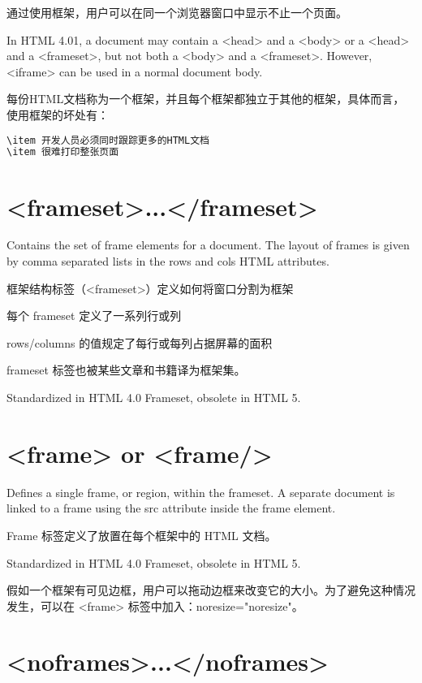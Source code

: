 通过使用框架，用户可以在同一个浏览器窗口中显示不止一个页面。

In HTML 4.01, a document may contain a <head> and a <body> or a <head> and a <frameset>, but not both a <body> and a <frameset>. However, <iframe> can be used in a normal document body.

每份HTML文档称为一个框架，并且每个框架都独立于其他的框架，具体而言，使用框架的坏处有：

\begin{lstlisting}[language=HTML]
\item 开发人员必须同时跟踪更多的HTML文档
\item 很难打印整张页面
\end{lstlisting}


\section{<frameset>...</frameset>}


Contains the set of frame elements for a document. The layout of frames is given by comma separated lists in the rows and cols HTML attributes.

\begin{compactitem}
\item 框架结构标签（<frameset>）定义如何将窗口分割为框架
\item 每个 frameset 定义了一系列行或列
\item rows/columns 的值规定了每行或每列占据屏幕的面积
\end{compactitem}

frameset 标签也被某些文章和书籍译为框架集。

Standardized in HTML 4.0 Frameset, obsolete in HTML 5.


\section{<frame> or <frame/>}

Defines a single frame, or region, within the frameset. A separate document is linked to a frame using the src attribute inside the frame element.

Frame 标签定义了放置在每个框架中的 HTML 文档。

Standardized in HTML 4.0 Frameset, obsolete in HTML 5.

假如一个框架有可见边框，用户可以拖动边框来改变它的大小。为了避免这种情况发生，可以在 <frame> 标签中加入：noresize="noresize"。


\section{<noframes>...</noframes>}

